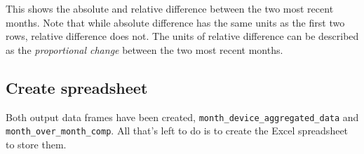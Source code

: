 \documentclass[
]{article}
\begin{document}
This shows the absolute and relative difference between the two most
recent months. Note that while absolute difference has the same units as
the first two rows, relative difference does not. The units of relative
difference can be described as the \emph{proportional change} between
the two most recent months.

\hypertarget{create-spreadsheet}{%
\subsection{Create spreadsheet}\label{create-spreadsheet}}

Both output data frames have been created,
\texttt{month\_device\_aggregated\_data} and
\texttt{month\_over\_month\_comp}. All that's left to do is to create
the Excel spreadsheet to store them.
\end{document}

